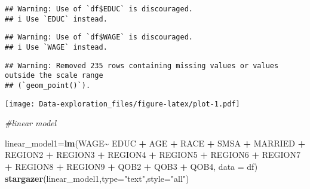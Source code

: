 \documentclass[
]{article}
\newenvironment{Shaded}{\begin{snugshade}}{\end{snugshade}}
\newcommand{\AttributeTok}[1]{\textcolor[rgb]{0.13,0.29,0.53}{#1}}
\newcommand{\CommentTok}[1]{\textcolor[rgb]{0.56,0.35,0.01}{\textit{#1}}}
\newcommand{\DecValTok}[1]{\textcolor[rgb]{0.00,0.00,0.81}{#1}}
\newcommand{\FunctionTok}[1]{\textcolor[rgb]{0.13,0.29,0.53}{\textbf{#1}}}
\newcommand{\NormalTok}[1]{#1}
\newcommand{\OtherTok}[1]{\textcolor[rgb]{0.56,0.35,0.01}{#1}}
\newcommand{\SpecialCharTok}[1]{\textcolor[rgb]{0.81,0.36,0.00}{\textbf{#1}}}
\newcommand{\StringTok}[1]{\textcolor[rgb]{0.31,0.60,0.02}{#1}}
\begin{document}
\begin{Shaded}
\end{Shaded}

\begin{verbatim}
## Warning: Use of `df$EDUC` is discouraged.
## i Use `EDUC` instead.
\end{verbatim}

\begin{verbatim}
## Warning: Use of `df$WAGE` is discouraged.
## i Use `WAGE` instead.
\end{verbatim}

\begin{verbatim}
## Warning: Removed 235 rows containing missing values or values outside the scale range
## (`geom_point()`).
\end{verbatim}

\texttt{[image: Data-exploration\_files/figure-latex/plot-1.pdf]}

\begin{Shaded}
\begin{Highlighting}[]
\CommentTok{\#linear model}

\NormalTok{linear\_model1}\OtherTok{=}\FunctionTok{lm}\NormalTok{(WAGE}\SpecialCharTok{\textasciitilde{}}\NormalTok{ EDUC }\SpecialCharTok{+}\NormalTok{ AGE }\SpecialCharTok{+}\NormalTok{ RACE }\SpecialCharTok{+}\NormalTok{ SMSA }\SpecialCharTok{+}\NormalTok{ MARRIED }\SpecialCharTok{+}\NormalTok{ REGION2 }\SpecialCharTok{+}\NormalTok{ REGION3 }\SpecialCharTok{+}\NormalTok{ REGION4 }\SpecialCharTok{+}\NormalTok{ REGION5 }\SpecialCharTok{+}\NormalTok{ REGION6 }\SpecialCharTok{+}\NormalTok{ REGION7 }\SpecialCharTok{+}\NormalTok{ REGION8 }\SpecialCharTok{+}\NormalTok{ REGION9  }\SpecialCharTok{+}\NormalTok{ QOB2 }\SpecialCharTok{+}\NormalTok{ QOB3 }\SpecialCharTok{+}\NormalTok{ QOB4, }\AttributeTok{data =}\NormalTok{ df)}
\FunctionTok{stargazer}\NormalTok{(linear\_model1,}\AttributeTok{type=}\StringTok{"text"}\NormalTok{,}\AttributeTok{style=}\StringTok{"all"}\NormalTok{)}
\end{Highlighting}
\end{Shaded}
\end{document}
